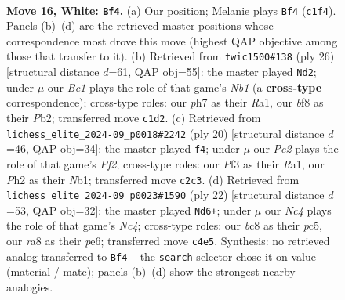 \documentclass[11pt]{article}
\begin{document}
\begin{figure}[p]
\label{fig:thought-m28}
\end{figure}

\clearpage

\begin{figure}[p]\centering
\begin{subfigure}{0.46\textwidth}\centering
\resizebox{\linewidth}{!}{%
\newchessgame
\chessboard[
  setfen={r1b2b1r/p2kn1pp/2pp4/5p2/2N5/3B1P2/PPP3PP/R1B1R1K1 w - - 6 16},
  showmover=false,
  pgfstyle=straightmove, color=movearrow, markmove={c1-f4}
]}
\caption{}
\end{subfigure}\hfill
\begin{subfigure}{0.46\textwidth}\centering
\resizebox{\linewidth}{!}{%
\newchessgame
\chessboard[
  setfen={r1b4r/1ppkb1pp/1n3p2/p7/P2p1B2/1B6/1PP2PPP/RN2R1K1 w - - 2 14},
  showmover=false,
  pgfstyle=straightmove, color=movearrow, markmove={b1-d2}
]}
\caption{}
\end{subfigure}
\\[4pt]
\begin{subfigure}{0.46\textwidth}\centering
\resizebox{\linewidth}{!}{%
\newchessgame
\chessboard[
  setfen={r1b1kb1r/1p1n1ppp/p3p3/2p1P3/8/4P3/PP2BPPP/RNBR2K1 w kq - 1 11},
  showmover=false,
  pgfstyle=straightmove, color=movearrow, markmove={f2-f4}
]}
\caption{}
\end{subfigure}\hfill
\begin{subfigure}{0.46\textwidth}\centering
\resizebox{\linewidth}{!}{%
\newchessgame
\chessboard[
  setfen={1rb1k2r/pp1nbppp/4p3/2p1P3/2N5/6P1/PP2PPBP/R1BR2K1 w k - 1 12},
  showmover=false,
  pgfstyle=straightmove, color=movearrow, markmove={c4-d6}
]}
\caption{}
\end{subfigure}
\caption{\textbf{Move 16, White: \texttt{Bf4}.} (a) Our position; Melanie plays \texttt{Bf4} (\texttt{c1f4}). Panels (b)--(d) are the retrieved master positions whose correspondence most drove this move (highest QAP objective among those that transfer to it). (b) Retrieved from \texttt{twic1500\#138} (ply 26) [structural distance $d$=61, QAP obj=55]: the master played \texttt{Nd2}; under $\mu$ our \emph{Bc1} plays the role of that game's \emph{Nb1} (a \textbf{cross-type} correspondence); cross-type roles: our \emph{p}h7 as their \emph{R}a1, our \emph{b}f8 as their \emph{P}b2; transferred move \texttt{c1d2}. (c) Retrieved from \texttt{lichess\_elite\_2024-09\_p0018\#2242} (ply 20) [structural distance $d$=46, QAP obj=34]: the master played \texttt{f4}; under $\mu$ our \emph{Pc2} plays the role of that game's \emph{Pf2}; cross-type roles: our \emph{P}f3 as their \emph{R}a1, our \emph{P}h2 as their \emph{N}b1; transferred move \texttt{c2c3}. (d) Retrieved from \texttt{lichess\_elite\_2024-09\_p0023\#1590} (ply 22) [structural distance $d$=53, QAP obj=32]: the master played \texttt{Nd6+}; under $\mu$ our \emph{Nc4} plays the role of that game's \emph{Nc4}; cross-type roles: our \emph{b}c8 as their \emph{p}c5, our \emph{r}a8 as their \emph{p}e6; transferred move \texttt{c4e5}. Synthesis: no retrieved analog transferred to \texttt{Bf4} -- the \texttt{search} selector chose it on value (material / mate); panels (b)--(d) show the strongest nearby analogies.}
\label{fig:thought-m30}
\end{figure}
\end{document}
